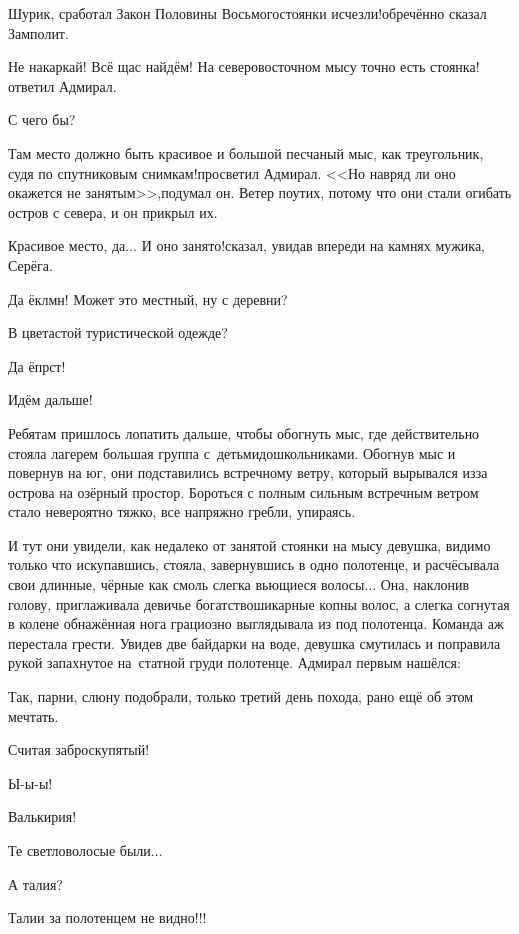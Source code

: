 \diagdash Шурик, сработал Закон Половины Восьмого\cite{Квадригин}\mdash стоянки исчезли!\mdash обречённо сказал Замполит.

\diagdash Не накаркай! Всё щас найдём! На северо\sdash восточном мысу точно есть стоянка!\mdash ответил Адмирал.

\diagdash С чего бы?

\diagdash Там место должно быть красивое и большой песчаный мыс, как треугольник, судя по спутниковым снимкам!\mdash просветил Адмирал. <<Но навряд ли оно окажется не занятым>>,\mdash подумал он. Ветер поутих, потому что они стали огибать остров с севера, и он прикрыл их.

\diagdash Красивое место, да$\ldots$ И оно занято!\mdash сказал, увидав впереди на камнях мужика, Серёга.

\diagdash Да ёклмн! Может это местный, ну с деревни?

\diagdash В цветастой туристической одежде?

\diagdash Да ёпрст!

\diagdash Идём дальше!

Ребятам пришлось лопатить дальше, чтобы обогнуть мыс, где действительно стояла лагерем большая группа с~детьми\sdash дошкольниками. Обогнув мыс и повернув на юг, они подставились встречному ветру, который вырывался из\sdash за острова на озёрный простор. Бороться с полным сильным встречным ветром стало невероятно тяжко, все напряжно гребли, упираясь.

И тут они увидели, как недалеко от занятой стоянки на мысу девушка, видимо только что искупавшись, стояла, завернувшись в одно полотенце, и расчёсывала свои длинные, чёрные как смоль слегка вьющиеся волосы$\ldots$ Она, наклонив голову, приглаживала девичье богатство\mdash шикарные копны волос, а слегка согнутая в колене обнажённая нога грациозно выглядывала из под полотенца. Команда аж перестала грести. Увидев две байдарки на воде, девушка смутилась и поправила рукой запахнутое на~статной груди полотенце. Адмирал первым нашёлся:

\diagdash Так, парни, слюну подобрали, только третий день похода, рано ещё об этом мечтать.

\diagdash Считая заброску\mdash пятый!

\diagdash Ы-ы-ы!

\diagdash Валькирия!

\diagdash Те светловолосые были$\ldots$

\diagdash А талия?

\diagdash Талии за полотенцем не видно!!!

